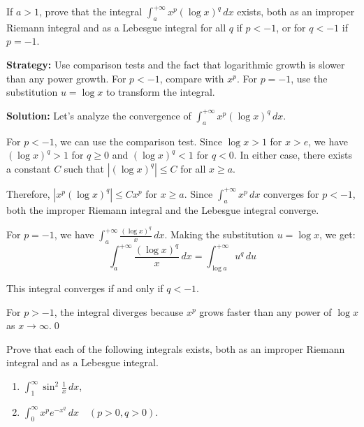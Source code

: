 \begin{problembox}
\begin{problemstatement}
If $a > 1$, prove that the integral $\int_{a}^{+\infty} x^p (\log x)^q \, dx$ exists, both as an improper Riemann integral and as a Lebesgue integral for all $q$ if $p < -1$, or for $q < -1$ if $p = -1$.
\end{problemstatement}
\end{problembox}

\noindent\textbf{Strategy:} Use comparison tests and the fact that logarithmic growth is slower than any power growth. For $p < -1$, compare with $x^p$. For $p = -1$, use the substitution $u = \log x$ to transform the integral.

\bigskip\noindent\textbf{Solution:}
Let's analyze the convergence of $\int_{a}^{+\infty} x^p (\log x)^q \, dx$.

For $p < -1$, we can use the comparison test. Since $\log x > 1$ for $x > e$, we have $(\log x)^q > 1$ for $q \geq 0$ and $(\log x)^q < 1$ for $q < 0$. In either case, there exists a constant $C$ such that $|(\log x)^q| \leq C$ for all $x \geq a$.

Therefore, $|x^p (\log x)^q| \leq C x^p$ for $x \geq a$. Since $\int_{a}^{+\infty} x^p \, dx$ converges for $p < -1$, both the improper Riemann integral and the Lebesgue integral converge.

For $p = -1$, we have $\int_{a}^{+\infty} \frac{(\log x)^q}{x} \, dx$. Making the substitution $u = \log x$, we get:
\[\int_{a}^{+\infty} \frac{(\log x)^q}{x} \, dx = \int_{\log a}^{+\infty} u^q \, du\]

This integral converges if and only if $q < -1$.

For $p > -1$, the integral diverges because $x^p$ grows faster than any power of $\log x$ as $x \to \infty$.\qed


\begin{problembox}
\begin{problemstatement}
Prove that each of the following integrals exists, both as an improper Riemann integral and as a Lebesgue integral.
\begin{enumerate}[label=(\alph*)]
\item $\int_{1}^{\infty} \sin^2 \frac{1}{x} \, dx$,
\item $\int_{0}^{\infty} x^pe^{-x^q} \, dx \quad (p > 0, q > 0)$.
\end{enumerate}
\end{problemstatement}
\end{problembox}

